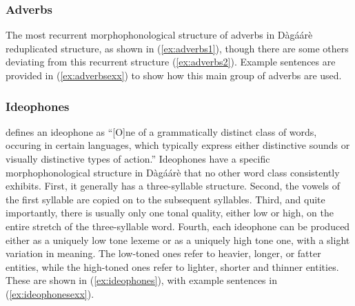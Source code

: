 \subsubsection{Adverbs}
The most recurrent morphophonological structure of adverbs in Dàgáárè
reduplicated structure, as shown in (\ref{ex:adverbs1}), though there are some others deviating from this
recurrent structure (\ref{ex:adverbs2}). Example sentences are provided in (\ref{ex:adverbsexx}) to show how this main
group of adverbs are used.

\ea {}
\z\z

\ea \label{ex:adverbsexx} 
 \z\z

\subsubsection{Ideophones}
\citet[131--132]{Trask1993} defines an ideophone as ``[O]ne of a grammatically distinct
class of words, occuring in certain languages, which typically express either distinctive
sounds or visually distinctive types of action.'' Ideophones have a specific morphophonological structure in Dàgáárè that no other word class consistently exhibits.
First, it generally has a three-syllable structure. Second, the vowels of the first syllable are
copied on to the subsequent syllables. Third, and quite importantly, there is usually only one
tonal quality, either low or high, on the entire stretch of the three-syllable word. Fourth, each
ideophone can be produced either as a uniquely low tone lexeme or as a uniquely high tone
one, with a slight variation in meaning. The low-toned ones refer to heavier, longer, or fatter
entities, while the high-toned ones refer to lighter, shorter and thinner entities. These are
shown in (\ref{ex:ideophones}), with example sentences in (\ref{ex:ideophonesexx}).

